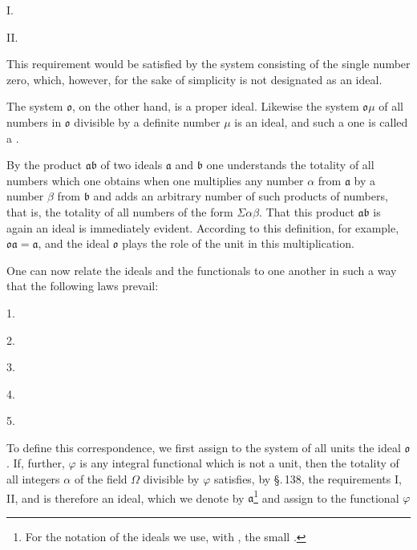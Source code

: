 I. 

II. 

This requirement would be satisfied by the system consisting of the single number zero, which, however, for the sake of simplicity is not designated as an ideal.

The system $\mathfrak{o}$, on the other hand, is a proper ideal. Likewise the system $\mathfrak{o}\mu$ of all numbers in $\mathfrak{o}$ divisible by a definite number $\mu$ is an ideal, and such a one is called a .

By the product $\mathfrak{a}\mathfrak{b}$ of two ideals $\mathfrak{a}$ and $\mathfrak{b}$ one understands the totality of all numbers which one obtains when one multiplies any number $\alpha$ from $\mathfrak{a}$ by a number $\beta$ from $\mathfrak{b}$ and adds an arbitrary number of such products of numbers, that is, the totality of all numbers of the form $\Sigma \alpha\beta$. That this product $\mathfrak{a}\mathfrak{b}$ is again an ideal is immediately evident. According to this definition, for example, $\mathfrak{o}\mathfrak{a} = \mathfrak{a}$, and the ideal $\mathfrak{o}$ plays the role of the unit in this multiplication.

One can now relate the ideals and the functionals to one another in such a way that the following laws prevail:

1. 

2. 

3. 

4. 

5. 

To define this correspondence, we first assign to the system of all units the ideal $\mathfrak{o}$. If, further, $\varphi$ is any integral functional which is not a unit, then the totality of all integers $\alpha$ of the field $\Omega$ divisible by $\varphi$ satisfies, by \S.\,138, the requirements I, II, and is therefore an ideal, which we denote by $\mathfrak{a}$\footnote{For the notation of the ideals we use, with , the small .} and assign to the functional $\varphi$
